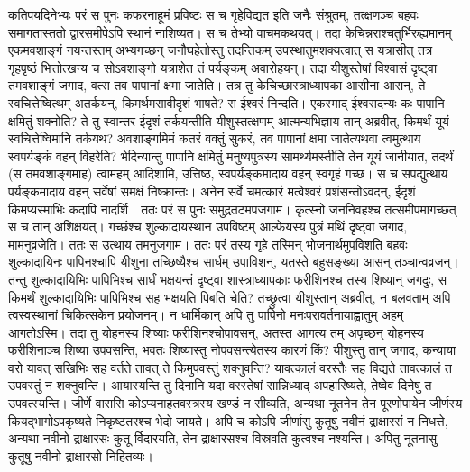 \adhyAya
{}
\vakya कतिपयदिनेभ्यः परं स पुनः कफरनाहूमं प्रविष्टः स च गृहेविद्यत इति जनैः संश्रुतम्,
\vakya तत्क्षणञ्च बहवः समागतास्ततो द्वारसमीपेऽपि स्थानं नाशिष्यत। स च तेभ्यो वाचमकथयत्।
\vakya तदा केचिन्नराश्चतुर्भिरुह्यमानम् एकमवशाङ्गं नयन्तस्तम् अभ्यगच्छन्
\vakya जनौघहेतोस्तु तदन्तिकम् उपस्थातुमशक्यत्वात् स यत्रासीत् तत्र गृहपृष्ठं भित्तोत्खन्य च सोऽवशाङ्गो यत्राशेत तं पर्यङ्कम् अवारोहयन्।
\vakya तदा यीशुस्तेषां विश्वासं दृष्ट्वा तमवशाङ्गं जगाद, वत्स तव पापानां क्षमा जातेति।
\vakya तत्र तु केचिच्छास्त्राध्यापका आसीना आसन्, ते स्वचित्तेष्वित्थम् अतर्कयन्,
\vakya किमर्थमसावीदृशं भाषते? स ईश्वरं निन्दति। एकस्माद् ईश्वरादन्यः कः पापानि क्षमितुं शक्नोति?
\vakya ते तु स्वान्तर ईदृशं तर्कयन्तीति यीशुस्तत्क्षणम् आत्मन्यभिज्ञाय तान् अब्रवीत्, किमर्थं यूयं स्वचित्तेष्विमानि तर्कयथ?
\vakya अवशाङ्गमिमं कतरं वक्तुं सुकरं, तव पापानां क्षमा जातेत्यथवा त्वमुत्थाय स्वपर्यङ्कं वहन् विहरेति?
\vakya भेदिन्यान्तु पापानि क्षमितुं मनुष्यपुत्रस्य सामर्थ्यमस्तीति तेन यूयं जानीयात, तदर्थं (स तमवशाङ्गमाह)
\vakya त्वामहम् आदिशामि, उत्तिष्ठ, स्वपर्यङ्कमादाय वहन् स्वगृहं गच्छ।
\vakya स च सपद्युत्थाय पर्यङ्कमादाय वहन् सर्वेषां समक्षं निष्क्रान्तः। अनेन सर्वे चमत्कारं मत्वेश्वरं प्रशंसन्तोऽवदन्, ईदृशं किमप्यस्माभिः कदापि नादर्शि।
\vakya ततः परं स पुनः समुद्रतटमपजगाम। कृत्स्नो जननिवहश्च तत्समीपमागच्छत् स च तान् अशिक्षयत्।
\vakya गच्छंश्च शुल्कादायस्थान उपविष्टम् आल्फेयस्य पुत्रं मथिं दृष्ट्वा जगाद, मामनुव्रजेति। ततः स उत्थाय तमनुजगाम।
\vakya ततः परं तस्य गृहे तस्मिन् भोजनार्थमुपविशति बहवः शुल्कादायिनः पापिनश्चापि यीशुना तच्छिष्यैश्च सार्धम् उपाविशन्, यतस्ते बहुसङ्ख्या आसन् तञ्चान्वव्रजन्।
\vakya तन्तु शुल्कादायिभिः पापिभिश्च सार्धं भक्षयन्तं दृष्ट्वा शास्त्राध्यापकाः फरीशिनश्च तस्य शिष्यान् जगदुः, स किमर्थं शुल्कादायिभिः पापिभिश्च सह भक्षयति पिबति चेति?
\vakya तच्छ्रुत्वा यीशुस्तान् अब्रवीत्, न बलवताम् अपि त्वस्वस्थानां चिकित्सकेन प्रयोजनम्। न धार्मिकान् अपि तु पापिनो मनःपरावर्तनायाह्वातुम् अहम् आगतोऽस्मि।
\vakya तदा तु योहनस्य शिष्याः फरीशिनश्चोपावसन्, अतस्त आगत्य तम् अपृच्छन् योहनस्य फरीशिनाञ्च शिष्या उपवसन्ति, भवतः शिष्यास्तु नोपवसन्त्येतस्य कारणं किं?
\vakya यीशुस्तु तान् जगाद, कन्याया वरो यावत् सखिभिः सह वर्तते तावत् ते किमुपवस्तुं शक्नुवन्ति? यावत्कालं वरस्तैः सह विद्यते तावत्कालं त उपवस्तुं न शक्नुवन्ति।
\vakya आयास्यन्ति तु दिनानि यदा वरस्तेषां सान्निध्याद् अपहारिष्यते, तेष्वेव दिनेषु त उपवत्स्यन्ति।
\vakya जीर्णे वाससि कोऽप्यनाहतवस्त्रस्य खण्डं न सीव्यति, अन्यथा नूतनेन तेन पूरणोपायेन जीर्णस्य कियद्भागोऽपकृष्यते निकृष्टतरश्च भेदो जायते।
\vakya अपि च कोऽपि जीर्णासु कुतूषु नवीनं द्राक्षारसं न निधत्ते, अन्यथा नवीनो द्राक्षारसः कुतू र्विदारयति, तेन द्राक्षारसश्च विस्रवति कुत्वश्च नश्यन्ति। अपितु नूतनासु कुतूषु नवीनो द्राक्षारसो निहितव्यः।
